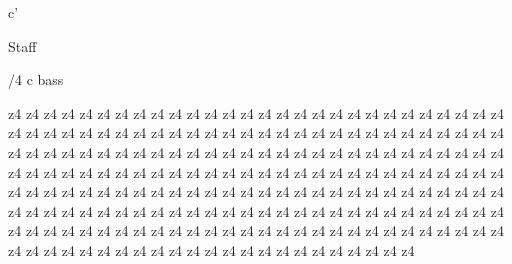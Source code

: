 \relative c' {
    \new Staff {
        /4
        \key c \major
        \clef bass
        
        z4
        z4
        z4
        z4
        z4
        z4
        z4
        z4
        z4
        z4
        z4
        z4
        z4
        z4
        z4
        z4
        z4
        z4
        z4
        z4
        z4
        z4
        z4
        z4
        z4
        z4
        z4
        z4
        z4
        z4
        z4
        z4
        z4
        z4
        z4
        z4
        z4
        z4
        z4
        z4
        z4
        z4
        z4
        z4
        z4
        z4
        z4
        z4
        z4
        z4
        z4
        z4
        z4
        z4
        z4
        z4
        z4
        z4
        z4
        z4
        z4
        z4
        z4
        z4
        z4
        z4
        z4
        z4
        z4
        z4
        z4
        z4
        z4
        z4
        z4
        z4
        z4
        z4
        z4
        z4
        z4
        z4
        z4
        z4
        z4
        z4
        z4
        z4
        z4
        z4
        z4
        z4
        z4
        z4
        z4
        z4
        z4
        z4
        z4
        z4
        z4
        z4
        z4
        z4
        z4
        z4
        z4
        z4
        z4
        z4
        z4
        z4
        z4
        z4
        z4
        z4
        z4
        z4
        z4
        z4
        z4
        z4
        z4
        z4
        z4
        z4
        z4
        z4
        z4
        z4
        z4
        z4
        z4
        z4
        z4
        z4
        z4
        z4
        z4
        z4
        z4
        z4
        z4
        z4
        z4
        z4
        z4
        z4
        z4
        z4
        z4
        z4
        z4
        z4
        z4
        z4
        z4
        z4
        z4
        z4
        z4
        z4
        z4
        z4
        z4
        z4
        z4
        z4
        z4
        z4
        z4
        z4
        z4
        z4
        z4
        z4
        z4
        z4
        z4
        z4
        z4
        z4
        z4
        z4
        z4
        z4
        z4
        z4
        z4
        z4
        z4
        z4
        z4
        z4
        z4
        z4
        z4
        z4
        z4
        z4
        z4
        z4
        z4
        z4
        z4
        z4
        z4
        z4
        z4
        z4
        z4
        z4
        z4
        z4
        z4
        z4
        z4
        z4
        z4
}}
